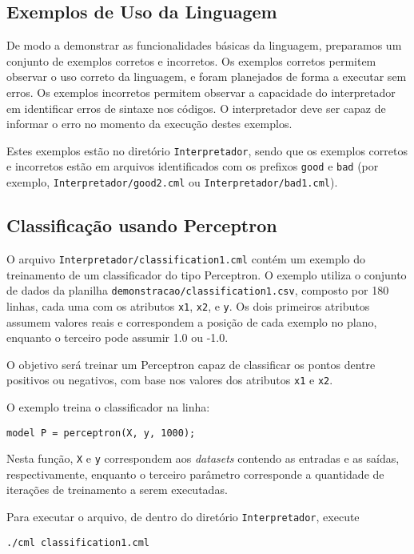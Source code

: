 \documentclass[12pt]{article}
\begin{document}
\subsection{Exemplos de Uso da Linguagem}

De modo a demonstrar as funcionalidades básicas da linguagem, preparamos um conjunto de exemplos corretos e incorretos. Os exemplos corretos permitem observar o uso correto da linguagem, e foram planejados de forma a executar sem erros. Os exemplos incorretos permitem observar a capacidade do interpretador em identificar erros de sintaxe nos códigos. O interpretador deve ser capaz de informar o erro no momento da execução destes exemplos.

Estes exemplos estão no diretório \texttt{Interpretador}, sendo que os exemplos corretos e incorretos estão em arquivos identificados com os prefixos \texttt{good} e \texttt{bad} (por exemplo, \texttt{Interpretador/good2.cml} ou \texttt{Interpretador/bad1.cml}).

\subsection{Classificação usando Perceptron}
O arquivo \texttt{Interpretador/classification1.cml} contém um exemplo do treinamento de um classificador do tipo Perceptron. O exemplo utiliza o conjunto de dados da planilha \texttt{demonstracao/classification1.csv}, composto por 180 linhas, cada uma com os atributos \texttt{x1}, \texttt{x2}, e \texttt{y}. Os dois primeiros atributos assumem valores reais e correspondem a posição de cada exemplo no plano, enquanto o terceiro pode assumir 1.0 ou -1.0.

O objetivo será treinar um Perceptron capaz de classificar os pontos dentre positivos ou negativos, com base nos valores dos atributos \texttt{x1} e \texttt{x2}.

O exemplo treina o classificador na linha:

\begin{verbatim}
model P = perceptron(X, y, 1000);
\end{verbatim}

Nesta função, \texttt{X} e \texttt{y} correspondem aos \textit{datasets} contendo as entradas e as saídas, respectivamente, enquanto o terceiro parâmetro corresponde a quantidade de iterações de treinamento a serem executadas.

Para executar o arquivo, de dentro do diretório \texttt{Interpretador}, execute

\begin{verbatim}
./cml classification1.cml
\end{verbatim}
\end{document}

